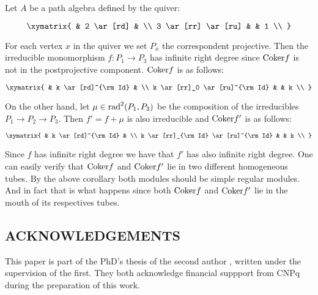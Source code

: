 \begin{exmp}{\rm Let $A$ be a path algebra defined by the quiver:

$$\xymatrix{
                       &                2      \ar[rd]   &                                \\
      3 \ar[rr]  \ar[ru]    &                            &  1                            \\
}$$

For each vertex $x$ in the quiver we set $P_x$ the correspondent projective. Then the irreducible monomorphism $f:P_1 \rightarrow P_3$ has infinite right degree since ${\rm Coker}f$ is not in the postprojective component. ${\rm Coker}f$ is as follows:

$$\xymatrix{
                       &                k      \ar[rd]^{\rm Id}   &                                \\
      k \ar[rr]_0  \ar[ru]^{\rm Id}    &                            &  k                            \\
}$$

On the other hand, let $\mu \in {\rm rad}^2(P_1, P_3)$ be the composition of the irreducibles $P_1 \rightarrow P_2 \rightarrow P_3$. Then $f'=f+ \mu$ is also irreducible and ${\rm Coker}f'$ is as follows:

$$\xymatrix{
                       &                k      \ar[rd]^{\rm Id}   &                                \\
      k \ar[rr]_{\rm Id}  \ar[ru]^{\rm Id}    &                            &  k                            \\
}$$

Since $f$ has infinite right degree we have that $f'$ has also infinite right degree. One can easily verify that ${\rm Coker}f$ and ${\rm Coker}f'$ lie in two different homogeneous tubes. By the above corollary both modules should be simple regular modules. And in fact that is what happens since both ${\rm Coker}f$ and ${\rm Coker}f'$ lie in the mouth of its respectives tubes.}

 
\end{exmp}

\subsection*{ACKNOWLEDGEMENTS} This paper is part of the PhD's thesis of the second author \cite{tese}, written under the supervision of the 
first. They both acknowledge financial suppport from CNPq during the preparation of this work. 

